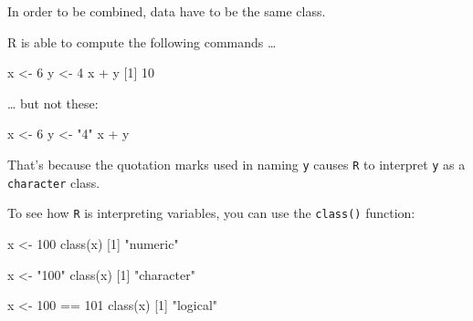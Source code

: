 \documentclass[
]{book}
\newenvironment{Shaded}{\begin{snugshade}}{\end{snugshade}}
\newcommand{\DecValTok}[1]{\textcolor[rgb]{0.00,0.00,0.81}{#1}}
\newcommand{\FunctionTok}[1]{\textcolor[rgb]{0.00,0.00,0.00}{#1}}
\newcommand{\NormalTok}[1]{#1}
\newcommand{\OtherTok}[1]{\textcolor[rgb]{0.56,0.35,0.01}{#1}}
\newcommand{\SpecialCharTok}[1]{\textcolor[rgb]{0.00,0.00,0.00}{#1}}
\newcommand{\StringTok}[1]{\textcolor[rgb]{0.31,0.60,0.02}{#1}}
\begin{document}
In order to be combined, data have to be the same class.

R is able to compute the following commands \ldots{}

\begin{Shaded}
\begin{Highlighting}[]
\NormalTok{x }\OtherTok{\textless{}{-}} \DecValTok{6}
\NormalTok{y }\OtherTok{\textless{}{-}} \DecValTok{4}
\NormalTok{x }\SpecialCharTok{+}\NormalTok{ y}
\NormalTok{[}\DecValTok{1}\NormalTok{] }\DecValTok{10}
\end{Highlighting}
\end{Shaded}

\ldots{} but not these:

\begin{Shaded}
\begin{Highlighting}[]
\NormalTok{x }\OtherTok{\textless{}{-}} \DecValTok{6}
\NormalTok{y }\OtherTok{\textless{}{-}} \StringTok{"4"}
\NormalTok{x }\SpecialCharTok{+}\NormalTok{ y}
\end{Highlighting}
\end{Shaded}

That's because the quotation marks used in naming \texttt{y} causes \texttt{R} to interpret \texttt{y} as a \texttt{character} class.

To see how \texttt{R} is interpreting variables, you can use the \texttt{class()} function:

\begin{Shaded}
\begin{Highlighting}[]
\NormalTok{x }\OtherTok{\textless{}{-}} \DecValTok{100}
\FunctionTok{class}\NormalTok{(x)}
\NormalTok{[}\DecValTok{1}\NormalTok{] }\StringTok{"numeric"}
\end{Highlighting}
\end{Shaded}

\begin{Shaded}
\begin{Highlighting}[]
\NormalTok{x }\OtherTok{\textless{}{-}} \StringTok{"100"}
\FunctionTok{class}\NormalTok{(x)}
\NormalTok{[}\DecValTok{1}\NormalTok{] }\StringTok{"character"}
\end{Highlighting}
\end{Shaded}

\begin{Shaded}
\begin{Highlighting}[]
\NormalTok{x }\OtherTok{\textless{}{-}} \DecValTok{100} \SpecialCharTok{==} \DecValTok{101}
\FunctionTok{class}\NormalTok{(x)}
\NormalTok{[}\DecValTok{1}\NormalTok{] }\StringTok{"logical"}
\end{Highlighting}
\end{Shaded}
\end{document}
